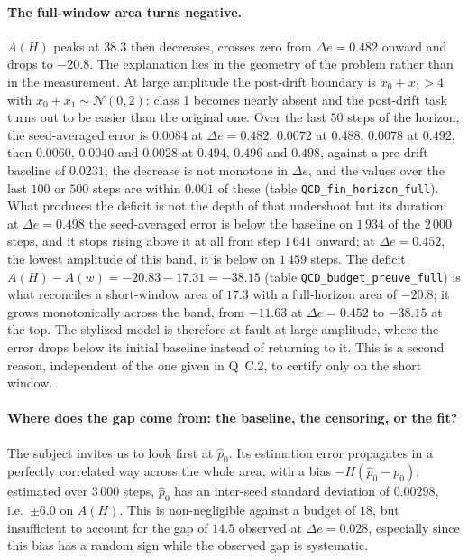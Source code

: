 \documentclass[11pt,a4paper]{article}
\begin{document}
\paragraph{The full-window area turns negative.} $A(H)$ peaks at $38.3$ then
decreases, crosses zero from $\Delta e = 0.482$ onward and drops to $-20.8$. The
explanation lies in the geometry of the problem rather than in the measurement. At
large amplitude the post-drift boundary is $x_0 + x_1 > 4$ with
$x_0 + x_1 \sim \mathcal{N}(0,2)$: class 1 becomes nearly absent and the post-drift
task turns out to be easier than the original one. Over the last $50$ steps of the
horizon, the seed-averaged error is $0.0084$ at $\Delta e = 0.482$, $0.0072$ at $0.488$,
$0.0078$ at $0.492$, then $0.0060$, $0.0040$ and $0.0028$ at $0.494$, $0.496$ and
$0.498$, against a pre-drift baseline of $0.0231$; the decrease is not monotone in
$\Delta e$, and the values over the last $100$ or $500$ steps are within $0.001$ of
these (table \texttt{QCD\_fin\_horizon\_full}). What produces the deficit is not the depth
of that undershoot but its duration: at $\Delta e = 0.498$ the seed-averaged error is
below the baseline on $1\,934$ of the $2\,000$ steps, and it stops rising above it at all
from step $1\,641$ onward; at $\Delta e = 0.452$, the lowest amplitude of this band, it is
below on $1\,459$ steps. The deficit
$A(H) - A(w) = -20.83 - 17.31 = -38.15$ (table \texttt{QCD\_budget\_preuve\_full}) is what
reconciles a short-window area of $17.3$ with a full-horizon area of $-20.8$; it grows
monotonically across the band, from $-11.63$ at $\Delta e = 0.452$ to $-38.15$ at the top. The
stylized model is therefore at fault at large amplitude, where the error drops below
its initial baseline instead of returning to it. This is a second reason, independent
of the one given in Q~C.2, to certify only on the short window.

\paragraph{Where does the gap come from: the baseline, the censoring, or the fit?}
The subject invites us to look first at $\hat p_0$. Its estimation error propagates in
a perfectly correlated way across the whole area, with a bias $-H(\hat p_0 - p_0)$;
estimated over 3\,000 steps, $\hat p_0$ has an inter-seed standard deviation of
$0.00298$, i.e.\ $\pm 6.0$ on $A(H)$. This is non-negligible against a budget of $18$,
but insufficient to account for the gap of $14.5$ observed at $\Delta e = 0.028$,
especially since this bias has a random sign while the observed gap is systematic.
\end{document}

